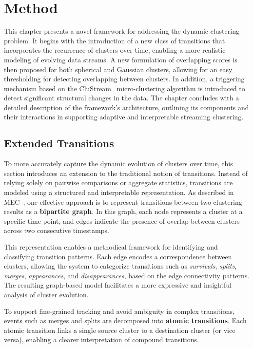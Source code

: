 \chapter{Method}\label{ch:method}

This chapter presents a novel framework for addressing the dynamic clustering
problem. It begins with the introduction of a new class of transitions that
incorporates the recurrence of clusters over time, enabling a more realistic
modeling of evolving data streams. A new formulation of overlapping scores is
then proposed for both spherical and Gaussian clusters, allowing for an easy
thresholding for detecting overlapping between clusters. In addition, a
triggering mechanism based on the CluStream~\cite{clustream} micro-clustering
algorithm is introduced to detect significant structural changes in the data.
The chapter concludes with a detailed description of the framework's
architecture, outlining its components and their interactions in supporting
adaptive and interpretable streaming clustering.

\section{Extended Transitions}\label{sec:extended_transitions}

To more accurately capture the dynamic evolution of clusters over time, this
section introduces an extension to the traditional notion of transitions.
Instead of relying solely on pairwise comparisons or aggregate statistics,
transitions are modeled using a structured and interpretable representation. As
described in MEC~\cite{mec}, one effective approach is to represent transitions
between two clustering results as a \textbf{bipartite graph}. In this graph,
each node represents a cluster at a specific time point, and edges indicate the
presence of overlap between clusters across two consecutive timestamps.

This representation enables a methodical framework for identifying and
classifying transition patterns. Each edge encodes a correspondence between
clusters, allowing the system to categorize transitions such as
\emph{survivals}, \emph{splits}, \emph{merges}, \emph{appearances}, and
\emph{disappearances}, based on the edge connectivity patterns. The resulting
graph-based model facilitates a more expressive and insightful analysis of
cluster evolution.



To support fine-grained tracking and avoid ambiguity in complex transitions,
events such as merges and splits are decomposed into \textbf{atomic
      transitions}. Each atomic transition links a single source cluster to a
destination cluster (or vice versa), enabling a clearer interpretation of
compound transitions.

